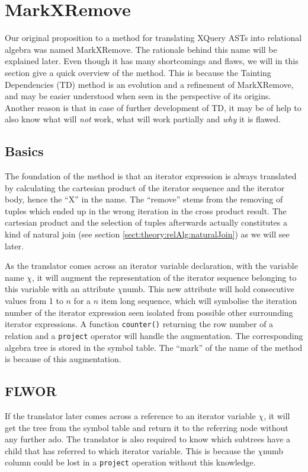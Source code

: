 \section{MarkXRemove}
\label{sect:trans:MarkXRemove}

Our original proposition to a method for translating XQuery ASTs into relational algebra was named MarkXRemove.
The rationale behind this name will be explained later. Even though it has many
shortcomings and flaws, we will in this section give a quick overview of the
method. This is because the Tainting Dependencies (TD) method is an evolution
and a refinement of MarkXRemove, and may be easier understood when seen in the perspective of its origins. Another reason is that in case of further development of TD, it may be of help to also know what will
\textit{not} work, what will work partially and \textit{why} it is flawed.

\subsection{Basics}
\label{sect:trans:mxr:basics}

The foundation of the method is that an iterator expression is always translated by calculating the cartesian
product of the iterator sequence and the iterator body, hence the ``X'' in the name. The ``remove'' stems from the
removing of tuples which ended up in the wrong iteration in the cross product
result. The cartesian product and the selection of tuples afterwards actually constitutes a kind of natural join (see section
\ref{sect:theory:relAlg:naturalJoin}) as we will see later.

As the translator comes across an iterator variable declaration, with the variable name $\chi$, it will augment
the representation of the iterator sequence belonging to this variable with an attribute $\chi$\textsf{numb}.
This new attribute will hold consecutive values from 1 to $n$ for a $n$ item long sequence, which will symbolise the
iteration number of the iterator expression seen isolated from possible other surrounding iterator expressions. A
function \texttt{counter()} returning the row number of a relation and a \texttt{project} operator will handle
the augmentation. The corresponding algebra tree is stored in the symbol table. The ``mark'' of the name of the
method is because of this augmentation.

\subsection{FLWOR}
\label{sect:trans:mxr:flwor}
If the translator later comes across a reference to an iterator variable $\chi$,
it will get the tree from the symbol table and return it to the referring node without any further ado. The translator is also required to know
which subtrees have a child that has referred to which iterator variable. This is because the $\chi$\textsf{numb}
column could be lost in a \texttt{project} operation without this knowledge.

